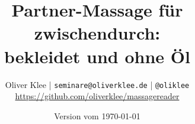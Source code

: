 \documentclass[a4paper,twoside,12pt,titlepage,headsepline]{scrartcl}
\author{Oliver Klee | \texttt{seminare@oliverklee.de} | \texttt{@oliklee}\\\url{https://github.com/oliverklee/massagereader}}
\title{Partner-Massage für zwischendurch:\\bekleidet und ohne Öl}
\date{Version vom \today}
\begin{document}
\nocite*{}

\maketitle

\tableofcontents



\pagebreak


\pagebreak


\pagebreak


\pagebreak


\pagebreak
\end{document}
